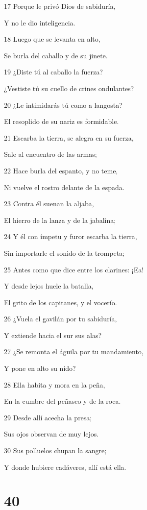 \par 17 Porque le privó Dios de sabiduría,
\par Y no le dio inteligencia.
\par 18 Luego que se levanta en alto, 
\par Se burla del caballo y de su jinete.
\par 19 ¿Diste tú al caballo la fuerza?
\par ¿Vestiste tú su cuello de crines ondulantes? 
\par 20 ¿Le intimidarás tú como a langosta?
\par El resoplido de su nariz es formidable.
\par 21 Escarba la tierra, se alegra en su fuerza,
\par Sale al encuentro de las armas;
\par 22 Hace burla del espanto, y no teme,
\par Ni vuelve el rostro delante de la espada.
\par 23 Contra él suenan la aljaba,
\par El hierro de la lanza y de la jabalina;
\par 24 Y él con ímpetu y furor escarba la tierra,
\par Sin importarle el sonido de la trompeta;
\par 25 Antes como que dice entre los clarines: ¡Ea!
\par Y desde lejos huele la batalla,
\par El grito de los capitanes, y el vocerío.
\par 26 ¿Vuela el gavilán por tu sabiduría,
\par Y extiende hacia el sur sus alas?
\par 27 ¿Se remonta el águila por tu mandamiento,
\par Y pone en alto su nido?
\par 28 Ella habita y mora en la peña,
\par En la cumbre del peñasco y de la roca.
\par 29 Desde allí acecha la presa;
\par Sus ojos observan de muy lejos.
\par 30 Sus polluelos chupan la sangre;
\par Y donde hubiere cadáveres, allí está ella.

\chapter{40}

